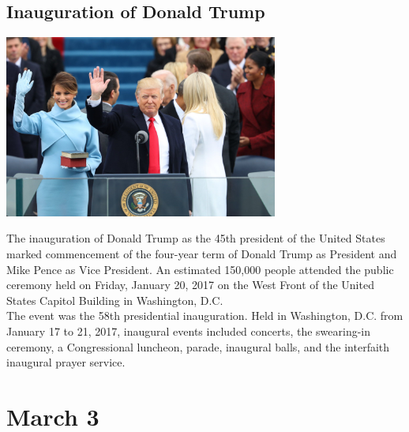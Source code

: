 \documentclass[11pt]{report}
\begin{document}
\subsection{Inauguration of Donald Trump}
\vspace{2mm}\begin{center}\includegraphics[width=9cm]{./img/trumpInaug.jpg}\end{center}
The inauguration of Donald Trump as the 45th president of the United States marked commencement of the four-year term of Donald Trump as President and Mike Pence as Vice President. An estimated 150,000 people attended the public ceremony held on Friday, January 20, 2017 on the West Front of the United States Capitol Building in Washington, D.C.\\
\indent The event was the 58th presidential inauguration. Held in Washington, D.C. from January 17 to 21, 2017, inaugural events included concerts, the swearing-in ceremony, a Congressional luncheon, parade, inaugural balls, and the interfaith inaugural prayer service.
\section{March 3}
\end{document}
